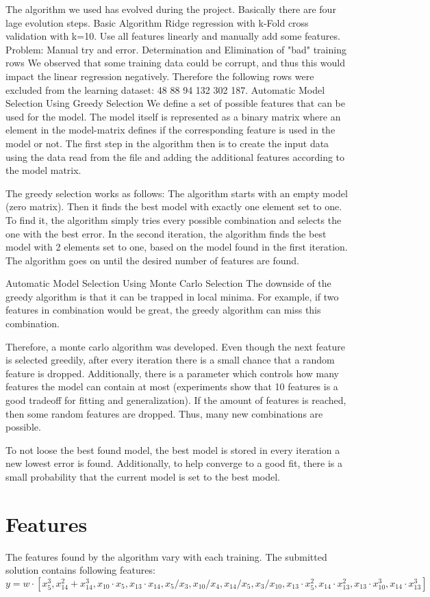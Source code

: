 \documentclass[a4paper, 11pt]{article}
\begin{document}
The algorithm we used has evolved during the project. Basically there are four lage evolution steps.
Basic Algorithm
Ridge regression with k-Fold cross validation with k=10. Use all features linearly and manually add some features. Problem: Manual try and error.
Determination and Elimination of "bad" training rows
We observed that some training data could be corrupt, and thus this would impact the linear regression negatively. Therefore the following rows were excluded from the learning dataset:
48 88 94 132 302 187.
Automatic Model Selection Using Greedy Selection
We define a set of possible features that can be used for the model. The model itself is represented as a binary matrix where an element in the model-matrix defines if the corresponding feature is used in the model or not.
The first step in the algorithm then is to create the input data using the data read from the file and adding the additional features according to the model matrix.

The greedy selection works as follows:
The algorithm starts with an empty model (zero matrix). Then it finds the best model with exactly one element set to one. To find it, the algorithm simply tries every possible combination and selects the one with the best error. In the second iteration, the algorithm finds the best model with 2 elements set to one, based on the model found in the first iteration. The algorithm goes on until the desired number of features are found.

Automatic Model Selection Using Monte Carlo Selection
The downside of the greedy algorithm is that it can be trapped in local minima. For example, if two features in combination would be great, the greedy algorithm can miss this combination.

Therefore, a monte carlo algorithm was developed. Even though the next feature is selected greedily, after every iteration there is a small chance that a random feature is dropped. Additionally, there is a parameter which controls how many features the model can contain at most (experiments show that 10 features is a good tradeoff for fitting and generalization). If the amount of features is reached, then some random features are dropped. Thus, many new combinations are possible.

To not loose the best found model, the best model is stored in every iteration a new lowest error is found. Additionally, to help converge to a good fit, there is a small probability that the current model is set to the best model.

\section{Features}
\label{sec:Features}
The features found by the algorithm vary with each training. The submitted solution contains following features:
$$ y = w \cdot [x_5^3, x_{14}^2 + x_{14}^3, x_{10} \cdot x_5, x_{13} \cdot x_{14}, x_{5}/x_{3}, x_{10}/x_{4}, x_{14}/x_{5}, x_{3}/x_{10}, x_{13} \cdot x_{5}^2,x_{14} \cdot x_{13}^2, x_{13} \cdot x_{10}^3, x_{14}\cdot x_{13}^3] $$
\end{document}
